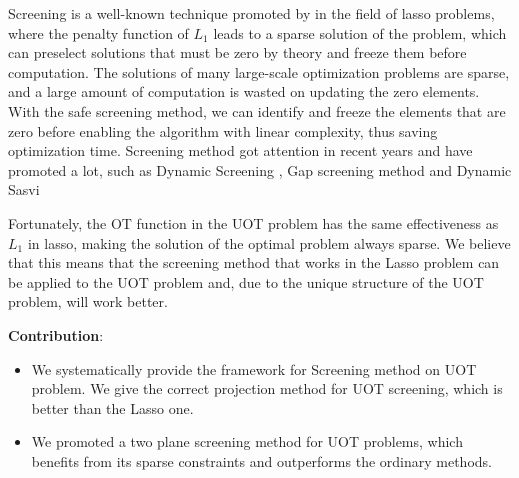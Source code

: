 Screening is a well-known technique promoted by \citep{ghaoui2010safe} in the field of lasso problems, where the penalty function of $L_1$ leads to a sparse solution of the problem, which can preselect solutions that must be zero by theory and freeze them before computation. The solutions of many large-scale optimization problems are sparse, and a large amount of computation is wasted on updating the zero elements. With the safe screening method, we can identify and freeze the elements that are zero before enabling the algorithm with linear complexity, thus saving optimization time. Screening method got  attention in recent years and have promoted a lot, such as Dynamic Screening \citep{7128732}, Gap screening method \citep{JMLR:v18:16-577} and Dynamic Sasvi \citep{NEURIPS2021_7b5b23f4}

Fortunately, the OT function in the UOT problem has the same effectiveness as $L_1$ in lasso, making the solution of the optimal problem always sparse. We believe that this means that the screening method that works in the Lasso problem can be applied to the UOT problem and, due to the unique structure of the UOT problem, will work better.


\textbf{Contribution}: 
\begin{itemize}
\item We systematically provide the framework for Screening method on UOT problem. We give the correct projection method for UOT screening, which is better than the Lasso one. 
\item We promoted a two plane screening method for UOT problems, which benefits from its sparse constraints and outperforms the ordinary methods.
\end{itemize}



